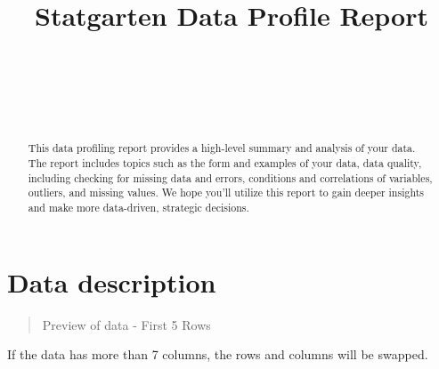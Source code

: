 \documentclass{article}
\title{Statgarten Data Profile Report}
\author{
    
   \\
     \\
   \\
  \texttt{} \\
  }
\begin{document}
\maketitle


\begin{abstract}
This data profiling report provides a high-level summary and analysis of
your data. The report includes topics such as the form and examples of
your data, data quality, including checking for missing data and errors,
conditions and correlations of variables, outliers, and missing values.
We hope you'll utilize this report to gain deeper insights and make more
data-driven, strategic decisions.
\end{abstract}


\newpage

\hypertarget{data-description}{%
\section{Data description}\label{data-description}}

\begin{quote}
Preview of data - First 5 Rows
\end{quote}

If the data has more than 7 columns, the rows and columns will be
swapped.
\end{document}
